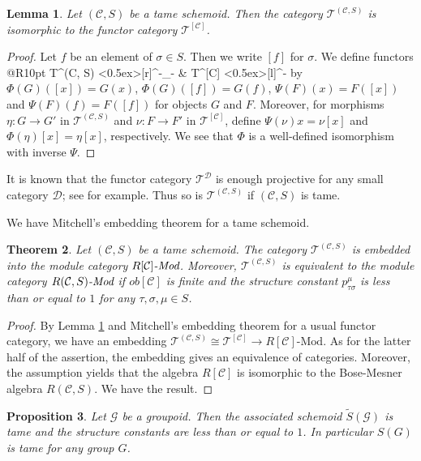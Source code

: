 \documentclass{amsart}
\newtheorem{thm}{Theorem}[section]
\newtheorem{prop}[thm]{Proposition}
\newtheorem{lem}[thm]{Lemma}
\theoremstyle{definition}
\theoremstyle{remark}
\newcommand{\K}{R}%
\newcommand{\G}{{\mathcal G}}
\newcommand{\C}{{\mathcal C}}
\newcommand{\T}{{\mathcal T}}
\newcommand{\D}{\mathcal{D}}
\begin{document}
\begin{lem} \label{lem:isomorphisms}
Let $(\C, S)$ be a tame schemoid. Then the category $\T^{(\C, S)}$ is isomorphic to the functor category 
$\T^{[\C]}$. 
\end{lem}

\begin{proof} 
Let $f$ be an element of $\sigma \in S$. Then we write $[f]$ for $\sigma$. 
We define functors 
@R10pt{
\T^{(\C, S)}  \ar@<0.5ex>[r]^-{\Phi}_-{} &
\T^{[\C]}   \ar@<0.5ex>[l]^-{\Psi} } 
by 
$\Phi(G)([x]) = G(x)$, $\Phi(G)([f]) = G(f)$,  $\Psi(F)(x) = F([x])$ and $\Psi(F)(f)= F([f])$ for objects $G$ and $F$. 
Moreover, for morphisms $\eta : G \to G'$ in $\T^{(\C, S)}$ and $\nu : F \to F'$ in $\T^{[\C]}$, define 
$\Psi(\nu)x = \nu[x]$ and $\Phi(\eta)[x] = \eta[x]$, respectively. We see that $\Phi$ is a well-defined isomorphism with inverse $\Psi$. 
\end{proof}

It is known that the functor category $\T^\D$ is enough projective for any small category $\D$; see \cite[page 25]{Mitchell81} 
for example. Thus so is $\T^{(\C, S)}$ if $(\C, S)$ is tame. 

We have Mitchell's embedding theorem for a tame schemoid. 

\begin{thm} \label{thm:Mitchell's_thm} Let $(\C, S)$ be a tame schemoid. 
The category $\T^{(\C, S)}$ is embedded into the module category $\K[\C]\text{\em -Mod}$. 
Moreover,  $\T^{(\C, S)}$ is equivalent to the module category $\K(\C, S)\text{\em -Mod}$ 
if $ob [\C]$ is finite and 
the structure constant $p_{\tau \sigma}^\mu$ is less than or equal to $1$ for any $\tau, \sigma, \mu \in S$. 
\end{thm}

\begin{proof}
By Lemma \ref{lem:isomorphisms} and Mitchell's embedding theorem for a usual functor category, we have an 
embedding $\T^{(\C, S)} \cong \T^{[\C]} \to \K[\C]\text{-Mod}$. As for the latter half of the assertion, 
the embedding gives an equivalence of categories.  Moreover, the assumption yields that 
the algebra $\K[\C]$ is isomorphic to the Bose-Mesner algebra $\K(\C, S)$. We have the result. 
\end{proof}

\begin{prop}\label{prop:groupoids}
Let $\G$ be a groupoid. Then the associated schemoid 
$\widetilde{S}(\G)$ is tame and the structure constants are less than or equal to $1$. 
In particular $S(G)$ is tame for any group $G$. 
\end{prop}
\end{document}
